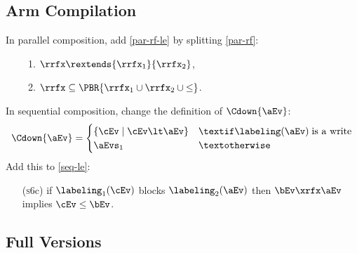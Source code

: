 \subsection{Arm Compilation}
In parallel composition, add \eqref{par-rf-le} by splitting
\eqref{par-rf}:
\begin{enumerate}[label=(\textsc{p}\arabic*),ref=\textsc{p}\arabic*]
  \setcounter{enumi}{7}  
\item[] 
  \begin{enumerate}[leftmargin=0pt]
  \item \label{par-rf-extends}
    ${\rrfx}\rextends{\rrfx_1}{\rrfx_2}$,
  \item \label{par-rf-le}
    ${\rrfx}\subseteq\PBR{{\rrfx_1}\cup{\rrfx_2}\cup{\le}}$.
  \end{enumerate}
\end{enumerate}
In sequential composition, change the definition of $\Cdown{\aEv}$:
\begin{displaymath}
  \Cdown{\aEv}=
  \begin{cases}
    \{ \cEv \mid \cEv \lt \aEv \} & \textif \labeling(\aEv) \;\text{is a write}
    \\
    \aEvs_1 & \textotherwise
  \end{cases}
\end{displaymath}
Add this to \ref{seq-le}:
\begin{enumerate}
\item[(\textsc{s}6c)] 
  if $\labeling_1(\cEv)$ blocks $\labeling_2(\aEv)$
  then $\bEv\xrfx\aEv$ implies $\cEv\le\bEv$.
\end{enumerate}
  
\subsection{Full Versions}

